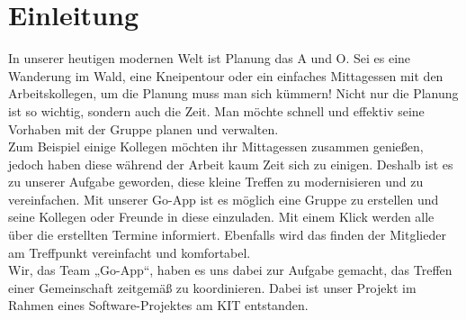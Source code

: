 \section{Einleitung}
In unserer heutigen modernen Welt ist Planung das A und O. Sei es eine Wanderung im Wald, eine Kneipentour oder ein einfaches Mittagessen mit den Arbeitskollegen, um die Planung muss man sich kümmern! 
Nicht nur die Planung ist so wichtig, sondern auch die Zeit. Man möchte schnell und effektiv seine Vorhaben mit der Gruppe planen und verwalten.\\
Zum Beispiel einige Kollegen möchten ihr Mittagessen zusammen genießen, jedoch haben diese während der Arbeit kaum Zeit sich zu einigen. Deshalb ist es zu unserer Aufgabe geworden, diese kleine Treffen zu modernisieren und zu vereinfachen. Mit unserer Go-App ist es möglich eine Gruppe zu erstellen und seine Kollegen oder Freunde in diese einzuladen. Mit einem Klick werden alle über die erstellten Termine informiert. Ebenfalls wird das finden der Mitglieder am Treffpunkt vereinfacht und komfortabel.\\
Wir, das Team „Go-App“, haben es uns dabei zur Aufgabe gemacht, das Treffen einer Gemeinschaft zeitgemäß zu koordinieren. Dabei ist unser Projekt im Rahmen eines Software-Projektes am KIT entstanden. \\